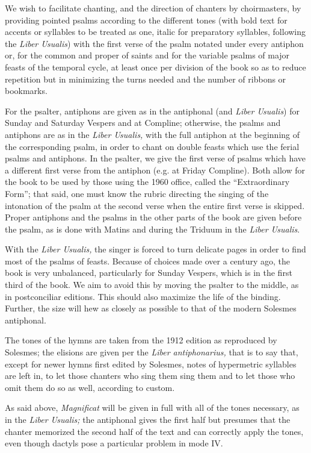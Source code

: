 \begin{enpars}
We wish to facilitate chanting, and the direction of chanters by choirmasters, by providing pointed psalms according to the different tones (with bold text for accents or syllables to be treated as one, italic for preparatory syllables, following the \textit{Liber Usualis}) with the first verse of the psalm notated under every antiphon or, for the common and proper of saints and for the variable psalms of major feasts of the temporal cycle, at least once per division of the book so as to reduce repetition but in minimizing the turns needed and the number of ribbons or bookmarks.

For the psalter, antiphons are given as in the antiphonal (and \textit{Liber Usualis}) for Sunday and Saturday Vespers and at Compline; otherwise, the psalms and antiphons are as in the \textit{Liber Usualis,} with the full antiphon at the beginning of the corresponding psalm, in order to chant on double feasts which use the ferial psalms and antiphons. In the psalter, we give the first verse of psalms which have a different first verse from the antiphon (e.g. at Friday Compline). Both allow for the book to be used by those using the 1960 office, called the ``Extraordinary Form''; that said, one must know the rubric directing the singing of the intonation of the psalm at the second verse when the entire first verse is skipped. Proper antiphons and the psalms in the other parts of the book are given before the psalm, as is done with Matins and during the Triduum in the \textit{Liber Usualis}.

With the \textit{Liber Usualis,} the singer is forced to turn delicate pages in order to find most of the psalms of feasts. Because of choices made over a century ago, the book is very unbalanced, particularly for Sunday Vespers, which is in the first third of the book. We aim to avoid this by moving the psalter to the middle, as in postconciliar editions. This should also maximize the life of the binding. Further, the size will hew as closely as possible to that of the modern Solesmes antiphonal.

The tones of the hymns are taken from the 1912 edition as reproduced by Solesmes; the elisions are given per the \textit{Liber antiphonarius,} that is to say that, except for newer hymns first edited by Solesmes, notes of hypermetric syllables are left in, to let those chanters who sing them sing them and to let those who omit them do so as well, according to custom.

As said above, \textit{Magnificat} will be given in full with all of the tones necessary, as in the \textit{Liber Usualis;} the antiphonal gives the first half but presumes that the chanter memorized the second half of the text and can correctly apply the tones, even though dactyls pose a particular problem in mode IV.


\end{enpars}
